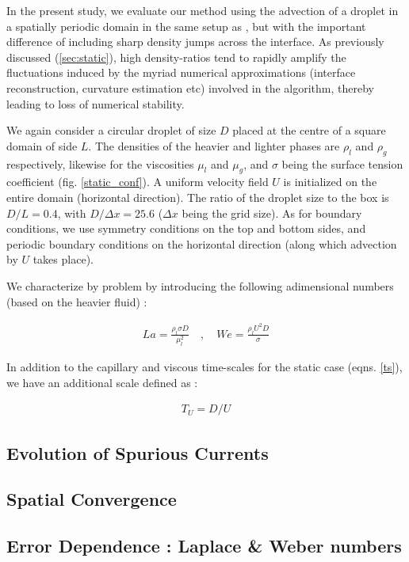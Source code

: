 In the present study, we evaluate our method using the advection of a droplet in a spatially periodic domain in the same setup as \cite{popinet2009accurate}, but with the important difference of including sharp density jumps across the interface. As previously discussed (\ref{sec:static}), high density-ratios tend to rapidly amplify the fluctuations induced by the myriad numerical approximations (interface reconstruction, curvature estimation etc) involved in the algorithm, thereby leading to loss of numerical stability.

We again consider a circular droplet of size $D$ placed at the centre of a square domain of side $L$. The densities of the heavier and lighter phases are $\rho_l$ and $\rho_g$ respectively, likewise for the viscosities $\mu_l$ and $\mu_g$, and $\sigma$ being the surface tension coefficient (fig. \ref{static_conf}). A uniform velocity field $U$ is initialized on the entire domain (horizontal direction). The ratio of the droplet size to the box is $D/L = 0.4$, with $D/\Delta x= 25.6$ ($\Delta x$ being the grid size). As for boundary conditions, we use symmetry conditions on the top and bottom sides, and periodic boundary conditions on the horizontal direction (along which advection by $U$ takes place).

We characterize by problem by introducing the following adimensional numbers (based on the heavier fluid) :

\begin{align}
        La = \frac{\rho_l \sigma D}{\mu_l^2} \quad , \quad We = \frac{\rho_l U^2 D}{\sigma}
\end{align}

In addition to the capillary and viscous time-scales for the static case (eqns. \ref{ts}), we have an additional scale defined as :

\begin{align}
     T_U = D/U
\end{align}


\subsection*{Evolution of Spurious Currents}
\blindtext

\subsection*{Spatial Convergence}
\blindtext

\subsection*{Error Dependence : Laplace \& Weber numbers}
\blindtext

